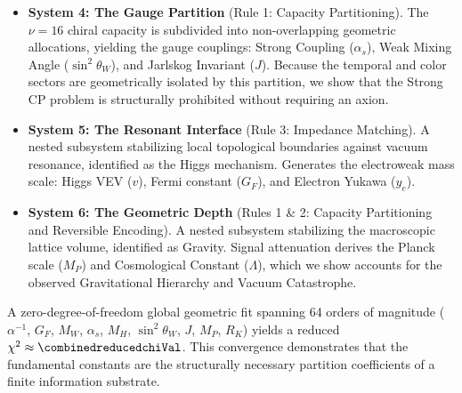 \begin{itemize}
    \item \textbf{System 4: The Gauge Partition} (Rule 1: Capacity Partitioning). The $\nu=16$ chiral capacity is subdivided into non-overlapping geometric allocations, yielding the gauge couplings: Strong Coupling ($\alpha_s$), Weak Mixing Angle ($\sin^2\theta_W$), and Jarlskog Invariant ($J$). Because the temporal and color sectors are geometrically isolated by this partition, we show that the Strong CP problem is structurally prohibited without requiring an axion.
    
    \item \textbf{System 5: The Resonant Interface} (Rule 3: Impedance Matching). A nested subsystem stabilizing local topological boundaries against vacuum resonance, identified as the Higgs mechanism. Generates the electroweak mass scale: Higgs VEV ($v$), Fermi constant ($G_F$), and Electron Yukawa ($y_e$).
    
    \item \textbf{System 6: The Geometric Depth} (Rules 1 \& 2: Capacity Partitioning and Reversible Encoding). A nested subsystem stabilizing the macroscopic lattice volume, identified as Gravity. Signal attenuation derives the Planck scale ($M_P$) and Cosmological Constant ($\Lambda$), which we show accounts for the observed Gravitational Hierarchy and Vacuum Catastrophe.
\end{itemize}

A zero-degree-of-freedom global geometric fit spanning 64 orders of magnitude ($\alpha^{-1}$, $G_F$, $M_W$, $\alpha_s$, $M_H$, $\sin^2\theta_W$, $J$, $M_P$, $R_K$) yields a reduced $\chi^2 \approx \combinedreducedchiVal$. This convergence demonstrates that the fundamental constants are the structurally necessary partition coefficients of a finite information substrate.